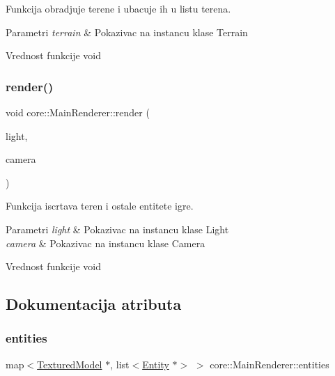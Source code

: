 Funkcija obradjuje terene i ubacuje ih u listu terena. 


\begin{DoxyParams}{Parametri}
{\em terrain} & Pokazivac na instancu klase Terrain \\
\hline
\end{DoxyParams}
\begin{DoxyReturn}{Vrednost funkcije}
void 
\end{DoxyReturn}
\mbox{\label{classcore_1_1MainRenderer_a3a8f4927df78f7b0ea7c4e5902569b1e}} 
\subsubsection{\texorpdfstring{render()}{render()}}
{\footnotesize\ttfamily void core\+::\+Main\+Renderer\+::render (\begin{DoxyParamCaption}\item[{\hyperlink{classentity_1_1Light}{Light} $\ast$}]{light,  }\item[{\hyperlink{classentity_1_1Camera}{Camera} $\ast$}]{camera }\end{DoxyParamCaption})}



Funkcija iscrtava teren i ostale entitete igre. 


\begin{DoxyParams}{Parametri}
{\em light} & Pokazivac na instancu klase Light \\
\hline
{\em camera} & Pokazivac na instancu klase Camera \\
\hline
\end{DoxyParams}
\begin{DoxyReturn}{Vrednost funkcije}
void 
\end{DoxyReturn}


\subsection{Dokumentacija atributa}
\mbox{\label{classcore_1_1MainRenderer_a609ec87995b16fcca439ce5585993fc4}} 
\subsubsection{\texorpdfstring{entities}{entities}}
{\footnotesize\ttfamily map$<$\hyperlink{classmodel_1_1TexturedModel}{Textured\+Model} $\ast$, list$<$\hyperlink{classentity_1_1Entity}{Entity} $\ast$$>$ $>$ core\+::\+Main\+Renderer\+::entities\hspace{0.3cm}{\ttfamily [private]}}



